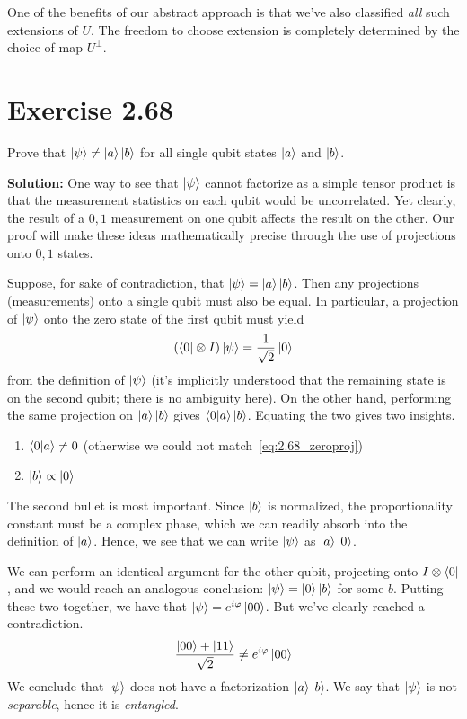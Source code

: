 \documentclass{book}
\begin{document}
    One of the benefits of our abstract approach is that we've also classified \emph{all} such extensions of $U$. The freedom to choose extension is completely determined by the choice of map $U^\perp$. 

\section*{Exercise 2.68}
    Prove that $\ket{\psi} \neq \ket{a}\ket{b}$ for all single qubit states $\ket{a}$ and $\ket{b}$.

    \textbf{Solution:} One way to see that $\ket{\psi}$ cannot factorize as a simple tensor product is that the measurement statistics on each qubit would be uncorrelated. Yet clearly, the result of a $0, 1$ measurement on one qubit affects the result on the other. Our proof will make these ideas mathematically precise through the use of projections onto $0, 1$ states. 

    Suppose, for sake of contradiction, that $\ket{\psi} = \ket{a}\ket{b}$. Then any projections (measurements) onto a single qubit must also be equal. In particular, a projection of $\ket{\psi}$ onto the zero state of the first qubit must yield
    \begin{align} \label{eq:2.68_zeroproj}
        (\bra{0}\otimes I) \ket{\psi} = \frac{1}{\sqrt{2}} \ket{0}
    \end{align}
    from the definition of $\ket{\psi}$ (it's implicitly understood that the remaining state is on the second qubit; there is no ambiguity here). On the other hand, performing the same projection on $\ket{a}\ket{b}$ gives $\braket{0}{a}\ket{b}$. Equating the two gives two insights.
    \begin{enumerate}
        \item $\bra{0}\ket{a} \neq 0$ (otherwise we could not match~\eqref{eq:2.68_zeroproj})
        \item $\ket{b} \propto \ket{0}$
    \end{enumerate}
    The second bullet is most important. Since $\ket{b}$ is normalized, the proportionality constant must be a complex phase, which we can readily absorb into the definition of $\ket{a}$. Hence, we see that we can write $\ket{\psi}$ as $\ket{a}\ket{0}$.

    We can perform an identical argument for the other qubit, projecting onto $I \otimes \bra{0}$, and we would reach an analogous conclusion: $\ket{\psi} = \ket{0}\ket{b}$ for some $b$. Putting these two together, we have that $\ket{\psi} = e^{i\varphi} \ket{00}$. But we've clearly reached a contradiction.
    \begin{align}
        \frac{\ket{00}+\ket{11}}{\sqrt{2}} \neq e^{i\varphi} \ket{00}
    \end{align}
    We conclude that $\ket{\psi}$ does not have a factorization $\ket{a}\ket{b}$. We say that $\ket{\psi}$ is not \emph{separable}, hence it is \emph{entangled}.
\end{document}
